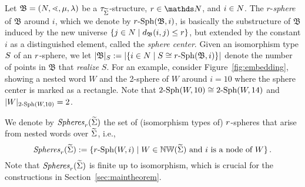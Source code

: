 \documentclass{LMCS}
\begin{document}
Let $\mathfrak{B}=(N,\mathord{\lessdot},\mu,\lambda)$ be a $\tau_{\widetilde{\Sigma}}$-structure,
$\radius \in \N$, and $i \in N$. The $r$-\emph{sphere} of $\mathfrak{B}$
around $i$, which we denote by $r\text{-}\mathrm{Sph}(\mathfrak{B},i)$, is basically the
substructure of $\mathfrak{B}$ induced by the new universe $\{j \in N \mid
d_\mathfrak{B}(i,j) \le r\}$, but extended by the constant $i$ as a
distinguished element, called the \emph{sphere center}.
Given an isomorphism type $S$ of an $r$-sphere, we let
$|\mathfrak{B}|_S := |\{i \in N \mid S \cong
r\text{-}\mathrm{Sph}(\mathfrak{B},i)\}|$ denote the number of points in $\mathfrak{B}$
that \emph{realize} $S$. For an example, consider Figure~\ref{fig:embedding},
showing a nested word $W$ and the 2-sphere of $W$ around $i=10$ where the
sphere center is marked as a rectangle. Note that $2\text{-}\mathrm{Sph}(W,10) \cong
2\text{-}\mathrm{Sph}(W,14)$ and $|W|_{2\text{-}\mathrm{Sph}(W,10)} = 2$.

We denote by $\mathit{Spheres}_r(\widetilde{\Sigma})$ the set of (isomorphism types of)
$r$-spheres that arise from nested words over $\widetilde{\Sigma}$, i.e.,
\[\mathit{Spheres}_r(\widetilde{\Sigma}) := \{r\text{-}\mathrm{Sph}(W,i) \mid W \in
\mathbb{NW}(\widetilde{\Sigma}) \text{~and~} i \text{~is a node of } W\}\,.\] Note that
$\mathit{Spheres}_r(\widetilde{\Sigma})$ is finite up to isomorphism, which is crucial
for the constructions in Section~\ref{sec:maintheorem}.
\end{document}
